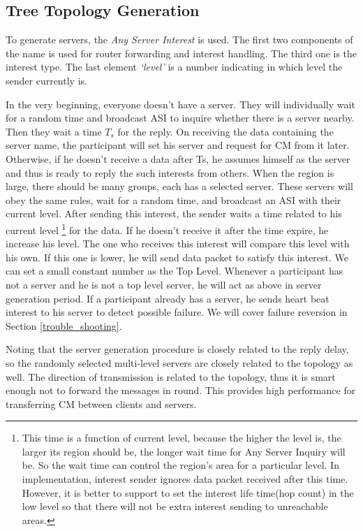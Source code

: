 \documentclass[conference]{IEEEtran}
\begin{document}
\subsection{Tree Topology Generation}

To generate servers, the \emph{Any Server Interest} is used.
The first two components of the name is used for router forwarding and interest handling.
The third one is the interest type.
The last element \emph{`level'} is a number indicating in which level the sender currently is.

In the very beginning,
everyone doesn't have a server.
They will individually wait for a random time and broadcast
ASI to inquire whether there is a server nearby.
Then they wait a time $T_s$ for the reply.
On receiving the data containing the server name,
the participant will set his server and request for CM from it later.
Otherwise, if he doesn't receive a data after Ts,
he assumes himself as the server and thus is ready to reply the such interests from others.
When the region is large, there should be many groups, each has a selected server.
These servers will obey the same rules, wait for a random time,
and broadcast an ASI with their current level.
After sending this interest,
the sender waits a time related to his current level
\footnote{This time is a function of current level, because the higher the level is,
the larger its region should be, the longer wait time for Any Server Inquiry will be.
So the wait time can control the region's area for a particular level.
In implementation, interest sender ignores data packet received after this time.
However, it is better to support to set the interest life time(hop count) in the low level
so that there will not be extra interest sending to unreachable areas.} for the data.
If he doesn't receive it after the time expire, he increase his level.
The one who receives this interest will compare this level with his own.
If this one is lower, he will send data packet to satisfy this interest.
We can set a small constant number as the Top Level.
Whenever a participant has not a server and he is not a top level server,
he will act as above in server generation period.
If a participant already has a server,
he sends heart beat interest to his server to detect possible failure.
We will cover failure reversion in Section \ref{trouble_shooting}.

Noting that the server generation procedure is closely related to the reply delay,
so the randomly selected multi-level servers are closely related to the topology as well.
The direction of transmission is related to the topology,
thus it is smart enough not to forward the messages in round.
This provides high performance for transferring CM between clients and servers.
\end{document}
